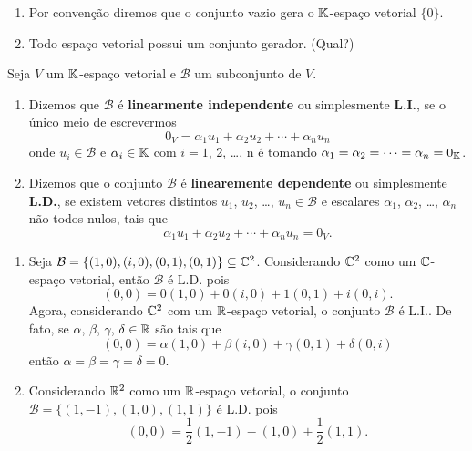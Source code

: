 \begin{observacao}
	\begin{enumerate}\label{conjuntogerador}
		\item Por conven\c{c}\~ao diremos que o conjunto vazio gera o $\mathbb{K}$-espa\c{c}o vetorial $\{0\}$.\label{geradorconjuntonulo}
		\item Todo espa\c{c}o vetorial possui um conjunto gerador. (Qual?)
	\end{enumerate}
\end{observacao}

\begin{definicao}
	Seja $V$ um $\mathbb{K}$-espa\c{c}o vetorial e $\mathcal{B}$ um subconjunto de $V$.
	\begin{enumerate}
		\item Dizemos que $\mathcal{B}$ \'e \textbf{linearmente independente} ou simplesmente \textbf{L.I.}, se o \'unico meio de escrevermos
		\[
			0_V = \alpha_1 u_1 + \alpha_2 u_2 + \cdots + \alpha_n u_n
		\]
		onde $u_i \in \mathcal{B}$ e $\alpha_i \in \mathbb{K}$ com $i = 1$, 2, \dots, n \'e tomando $\alpha_1 = \alpha_2 = \cdots = \alpha_n = 0_{\mathbb{K}}$.
		
		\item Dizemos que o conjunto $\mathcal{B}$ \'e \textbf{linearemente dependente} ou simplesmente 
		\textbf{L.D.}, se existem vetores distintos $u_1$, $u_2$, \dots, $u_n \in \mathcal{B}$ e escalares $\alpha_1$, $\alpha_2$, \dots, $\alpha_n$ n\~ao todos nulos, tais que
		\[
			\alpha_1 u_1 + \alpha_2 u_2 + \cdots + \alpha_n u_n = 0_V.
		\]
	\end{enumerate}
\end{definicao}

\begin{exemplo}
	\begin{enumerate}
		\item Seja $\mathcal{B} = \{(1, 0), (i, 0), (0, 1), (0, 1)\}\subseteq \mathbb{C}^2$. Considerando $\mathbb{C}^2$ como um $\mathbb{C}$-espa\c{c}o vetorial, ent\~ao $\mathcal{B}$ \'e L.D. pois
		\[
			(0, 0) = 0(1, 0) + 0(i, 0) + 1(0, 1) + i(0, i).
		\]
		Agora, considerando $\mathbb{C}^2$ com um $\mathbb{R}$-espa\c{c}o vetorial, o conjunto $\mathcal{B}$ \'e L.I.. De fato, se $\alpha$, $\beta$, $\gamma$, $\delta \in \mathbb{R}$ s\~ao tais que
		\[
			(0, 0 ) = \alpha(1, 0) + \beta(i, 0) + \gamma(0, 1) + \delta(0, i)
		\]
		ent\~ao $\alpha = \beta = \gamma = \delta = 0$.
		\item Considerando $\mathbb{R}^2$ como um $\mathbb{R}$-espa\c{c}o vetorial, o conjunto $\mathcal{B} = \{(1, -1), (1, 0), (1, 1)\}$ \'e L.D. pois
		\[
			(0, 0 ) = \dfrac{1}{2}(1, -1) - (1, 0) + \dfrac{1}{2}(1, 1).
		\]
	\end{enumerate}
\end{exemplo}

